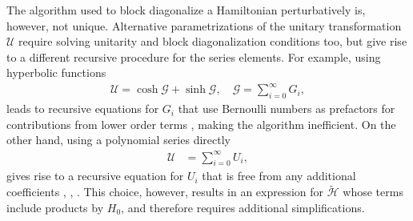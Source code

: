 The algorithm used to block diagonalize a Hamiltonian perturbatively is,
however, not unique.
Alternative parametrizations of the unitary transformation $\mathcal{U}$
require solving unitarity and block diagonalization conditions too, but
give rise to a different recursive procedure for the series elements.
For example, using hyperbolic functions
%
\begin{gather}
\mathcal{U} = \cosh{\mathcal{G}} + \sinh{\mathcal{G}}, \quad
\mathcal{G} = \sum_{i=0}^{\infty} G_i,
\end{gather}
%
leads to recursive equations for $G_i$ that use Bernoulli numbers as
prefactors for contributions from lower order terms \cite{Shavitt_1980},
making the algorithm inefficient.
On the other hand, using a polynomial series directly
%
\begin{align}
\mathcal{U} &= \sum_{i=0}^{\infty} U_i,
\end{align}
%
gives rise to a recursive equation for $U_i$ that is free from any additional
coefficients
\cite{Van_Vleck_1929}, \cite{Lowdin_1962}
\cite{Klein_1974}, \cite{Suzuki_1983}.
This choice, however, results in an expression for $\tilde{\mathcal{H}}$ whose
terms include products by $H_0$, and therefore requires additional
simplifications.

